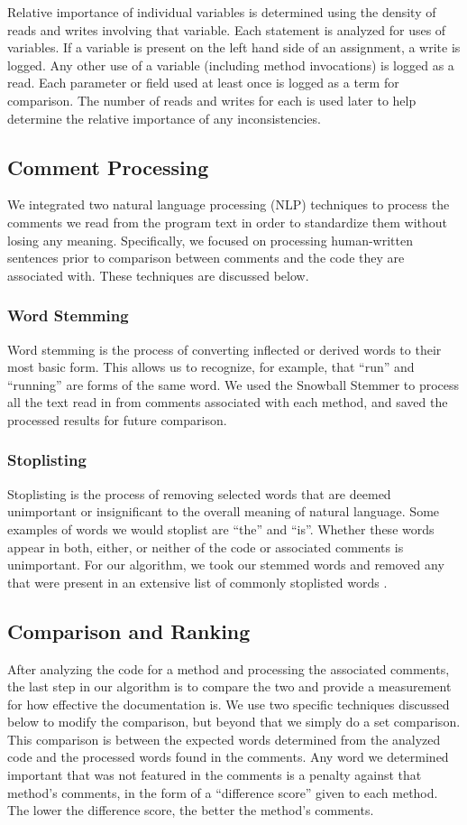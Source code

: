 \documentclass[preprint]{sigplanconf}
\begin{document}
Relative importance of individual variables is determined using the density of reads and writes involving that variable. Each statement is analyzed for uses of variables. If a variable is present on the left hand side of an assignment, a write is logged. Any other use of a variable (including method invocations) is logged as a read. Each parameter or field used at least once is logged as a term for comparison. The number of reads and writes for each is used later to help determine the relative importance of any inconsistencies.

\subsection{Comment Processing}
We integrated two natural language processing (NLP) techniques to process the comments we read from the program text in order to standardize them without losing any meaning. Specifically, we focused on processing human-written sentences prior to comparison between comments and the code they are associated with. These techniques are discussed below.

\subsubsection{Word Stemming}
Word stemming is the process of converting inflected or derived words to their most basic form. This allows us to recognize, for example, that ``run'' and ``running'' are forms of the same word. We used the Snowball Stemmer to process all the text read in from comments associated with each method, and saved the processed results for future comparison.

\subsubsection{Stoplisting}
Stoplisting is the process of removing selected words that are deemed unimportant or insignificant to the overall meaning of natural language. Some examples of words we would stoplist are ``the'' and ``is''. Whether these words appear in both, either, or neither of the code or associated comments is unimportant. For our algorithm, we took our stemmed words and removed any that were present in an extensive list of commonly stoplisted words \cite{xpo6}.

\subsection{Comparison and Ranking}
After analyzing the code for a method and processing the associated comments, the last step in our algorithm is to compare the two and provide a measurement for how effective the documentation is. We use two specific techniques discussed below to modify the comparison, but beyond that we simply do a set comparison.
This comparison is between the expected words determined from the analyzed code and the processed words found in the comments. Any word we determined important that was not featured in the comments is a penalty against that method's comments, in the form of a ``difference score'' given to each method. The lower the difference score, the better the method's comments.
\end{document}
